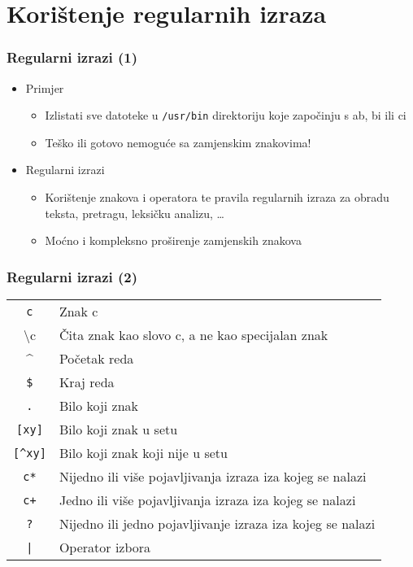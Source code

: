 \documentclass[table,usenames,dvipsnames]{beamer}
\newcommand{\shell}[1]{\texttt{#1}}
\begin{document}
\section{Korištenje regularnih izraza}
\begin{frame}[t]
\frametitle{Regularni izrazi (1)}
\begin{itemize}
  \item Primjer
  \begin{itemize}
    \item Izlistati sve datoteke u \shell{/usr/bin} direktoriju koje 
          započinju s ab, bi ili ci
    \item Teško ili gotovo nemoguće sa zamjenskim znakovima!
  \end{itemize}
  \item Regularni izrazi
  \begin{itemize}
    \item Korištenje znakova i operatora te pravila regularnih izraza za 
          obradu teksta, pretragu, leksičku analizu, \ldots
    \item Moćno i kompleksno proširenje zamjenskih znakova
  \end{itemize}
\end{itemize}
\end{frame}

\begin{frame}[t]
\frametitle{Regularni izrazi (2)}
\begin{table}[h]
\begin{tabular}{c l}
  \shell{c} & Znak c \\
  \textbackslash{}c & Čita znak kao slovo c, a ne kao specijalan znak \\
  \textasciicircum{} & Početak reda \\
  \shell{\$} & Kraj reda \\
  \shell{.} & Bilo koji znak \\
  \shell{[xy]} & Bilo koji znak u setu \\
  \shell{[\textasciicircum{}xy]} &  Bilo koji znak koji nije u setu \\
  \shell{c*} &Nijedno ili više pojavljivanja izraza iza kojeg se nalazi \\
  \shell{c+} & Jedno ili više pojavljivanja izraza iza kojeg se nalazi \\
  \shell{?} & Nijedno ili jedno pojavljivanje izraza iza kojeg se nalazi \\
  \shell{|} & Operator izbora
\end{tabular}
\end{table}
\end{frame}
  
\end{document}
